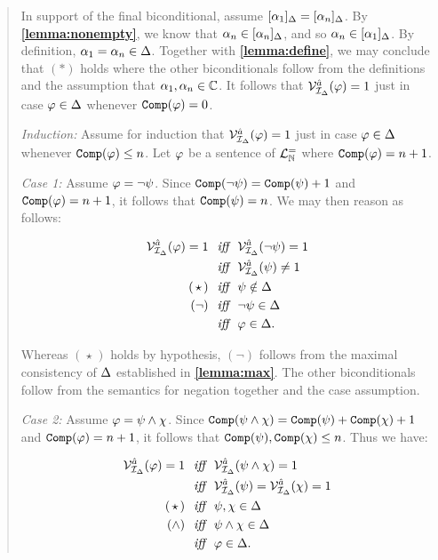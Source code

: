 \begin{quote}
  In support of the final biconditional, assume $[\alpha_1]_{\Delta}=[\alpha_n]_{\Delta}$.
  By \textbf{\ref{lemma:nonempty}}, we know that $\alpha_n\in[\alpha_n]_{\Delta}$, and so $\alpha_n\in[\alpha_1]_{\Delta}$.
  By definition, $\alpha_1=\alpha_n\in\Delta$.
  Together with \textbf{\ref{lemma:define}}, we may conclude that $(\ast)$ holds where the other biconditionals follow from the definitions and the assumption that $\alpha_1,\alpha_n\in\mathbb{C}$.
  It follows that $\mathcal{V}_{\mathcal{I}_{\Delta}}^{\hat{a}}(\varphi)=1$ just in case $\varphi\in\Delta$ whenever $\texttt{Comp}(\varphi)=0$.

  \textit{Induction:}
  Assume for induction that $\mathcal{V}_{\mathcal{I}_{\Delta}}^{\hat{a}}(\varphi)=1$ just in case $\varphi\in\Delta$ whenever $\texttt{Comp}(\varphi)\leq n$. 
  Let $\varphi$ be a sentence of $\mathcal{L}^{=}_{\mathbb{N}}$ where $\texttt{Comp}(\varphi)=n+1$.

  \textit{Case 1:}
  Assume $\varphi=\neg\psi$.
  Since $\texttt{Comp}(\neg\psi)=\texttt{Comp}(\psi)+1$ and $\texttt{Comp}(\varphi)=n+1$, it follows that $\texttt{Comp}(\psi)=n$.
  We may then reason as follows:

  \vspace{-.2in}
  \begin{align*}
    \mathcal{V}_{\mathcal{I}_{\Delta}}^{\hat{a}}(\varphi)=1 &\textit{ ~iff~ } \mathcal{V}_{\mathcal{I}_{\Delta}}^{\hat{a}}(\neg\psi)=1\\
      &\textit{ ~iff~ } \mathcal{V}_{\mathcal{I}_{\Delta}}^{\hat{a}}(\psi)\neq 1 \\
      (\hspace{1.6pt}\star\hspace{1.6pt}) &\textit{ ~iff~ } \psi\notin\Delta \\
      (\neg) &\textit{ ~iff~ } \neg\psi\in\Delta \\
      &\textit{ ~iff~ } \varphi\in\Delta.
  \end{align*}

  Whereas $(\hspace{1pt}\star\hspace{1pt})$ holds by hypothesis, $(\neg)$ follows from the maximal consistency of $\Delta$ established in \textbf{\ref{lemma:max}}.
  The other biconditionals follow from the semantics for negation together and the case assumption.

  \textit{Case 2:}
  Assume $\varphi=\psi\wedge\chi$.
  Since $\texttt{Comp}(\psi\wedge\chi)=\texttt{Comp}(\psi)+\texttt{Comp}(\chi)+1$ and  $\texttt{Comp}(\varphi)=n+1$, it follows that $\texttt{Comp}(\psi), \texttt{Comp}(\chi)\leq n$.
  Thus we have:

  \vspace{-.2in}
  \begin{align*}
    \mathcal{V}_{\mathcal{I}_{\Delta}}^{\hat{a}}(\varphi)=1 &\textit{ ~iff~ } \mathcal{V}_{\mathcal{I}_{\Delta}}^{\hat{a}}(\psi\wedge\chi)=1\\
      &\textit{ ~iff~ } \mathcal{V}_{\mathcal{I}_{\Delta}}^{\hat{a}}(\psi)=\mathcal{V}_{\mathcal{I}_{\Delta}}^{\hat{a}}(\chi)=1 \\
      (\hspace{1.6pt}\star\hspace{1.6pt}) &\textit{ ~iff~ } \psi,\chi\in\Delta \\
      (\wedge) &\textit{ ~iff~ } \psi\wedge\chi\in\Delta \\
      &\textit{ ~iff~ } \varphi\in\Delta.
  \end{align*}


\end{quote}
